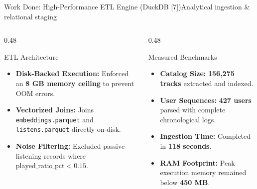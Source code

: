 \documentclass[aspectratio=169,10pt]{beamer}
\begin{document}
\begin{frame}{Work Done: High-Performance ETL Engine (DuckDB [7])}{Analytical ingestion \& relational staging}
    \begin{columns}[T]
        \begin{column}{0.48\textwidth}
            \begin{block}{ETL Architecture}
                \begin{itemize}\small
                    \item \textbf{Disk-Backed Execution:} Enforced an \textbf{8 GB memory ceiling} to prevent OOM errors.
                    \item \textbf{Vectorized Joins:} Joins \texttt{embeddings.parquet} and \texttt{listens.parquet} directly on-disk.
                    \item \textbf{Noise Filtering:} Excluded passive listening records where $\text{played\_ratio\_pct} < 0.15$.
                \end{itemize}
            \end{block}
        \end{column}

        \begin{column}{0.48\textwidth}
            \begin{exampleblock}{Measured Benchmarks}
                \begin{itemize}\small
                    \item \textbf{Catalog Size:} \textbf{156,275 tracks} extracted and indexed.
                    \item \textbf{User Sequences:} \textbf{427 users} parsed with complete chronological logs.
                    \item \textbf{Ingestion Time:} Completed in \textbf{118 seconds}.
                    \item \textbf{RAM Footprint:} Peak execution memory remained below \textbf{450 MB}.
                \end{itemize}
            \end{exampleblock}
        \end{column}
    \end{columns}
\end{frame}
\end{document}

